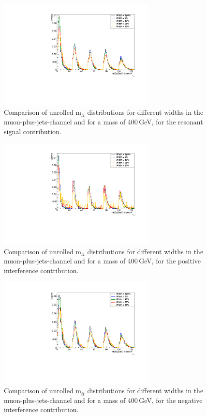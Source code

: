 \begin{figure}[!Hhtb]
\centering
\includegraphics[width=0.7\textwidth,keepaspectratio=true]{fig/chapt8/narrow/narrow_width_mujets_pos-sgn-M400.pdf}
\caption{Comparison of unrolled m$_{t\bar t}$ distributions for different widths in the muon-plus-jets-channel and for a mass of 400\,GeV, for the resonant signal contribution.}
\label{fig:narrow_signal}
\end{figure}

\begin{figure}[!Hhtb]
\centering
\includegraphics[width=0.7\textwidth,keepaspectratio=true]{fig/chapt8/narrow/narrow_width_mujets_pos-int-M400.pdf}
\caption{Comparison of unrolled m$_{t\bar t}$ distributions for different widths in the muon-plus-jets-channel and for a mass of 400\,GeV, for the positive interference contribution.}
\label{fig:narrow_posint}
\end{figure}


\begin{figure}[!Hhtb]
\centering
\includegraphics[width=0.7\textwidth,keepaspectratio=true]{fig/chapt8/narrow/narrow_width_mujets_neg-int-M400.pdf}
\caption{Comparison of unrolled m$_{t\bar t}$ distributions for different widths in the muon-plus-jets-channel and for a mass of 400\,GeV, for the negative interference contribution.}
\label{fig:narrow_negint}
\end{figure}


